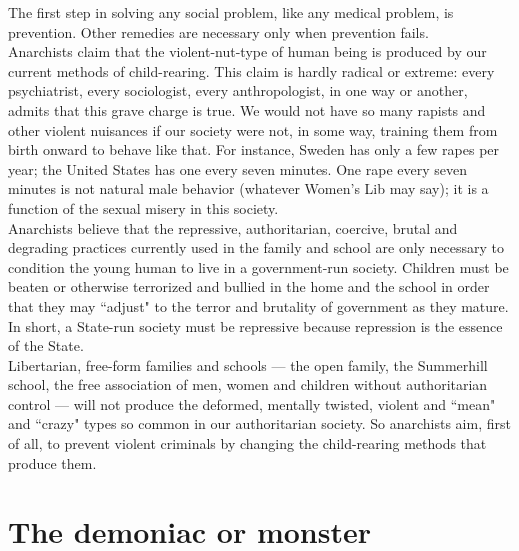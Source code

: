 The first step in solving any social problem, like any medical problem, is prevention. Other remedies are necessary only when prevention fails.\\
Anarchists claim that the violent-nut-type of human being is produced by our current methods of child-rearing. This claim is hardly radical or extreme: every psychiatrist, every sociologist, every anthropologist, in one way or another, admits that this grave charge is true. We would not have so many rapists and other violent nuisances if our society were not, in some way, training them from birth onward to behave like that. For instance, Sweden has only a few rapes per year; the United States has one every seven minutes. One rape every seven minutes is not natural male behavior (whatever Women's Lib may say); it is a function of the sexual misery in this society.\\
Anarchists believe that the repressive, authoritarian, coercive, brutal and degrading practices currently used in the family and school are only necessary to condition the young human to live in a government-run society. Children must be beaten or otherwise terrorized and bullied in the home and the school in order that they may ``adjust" to the terror and brutality of government as they mature. In short, a State-run society must be repressive because repression is the essence of the State.\\
Libertarian, free-form families and schools --- the open family, the Summerhill school, the free association of men, women and children without authoritarian control --- will not produce the deformed, mentally twisted, violent and ``mean" and ``crazy" types so common in our authoritarian society. So anarchists aim, first of all, to prevent violent criminals by changing the child-rearing methods that produce them.

\section*{The demoniac or monster}

